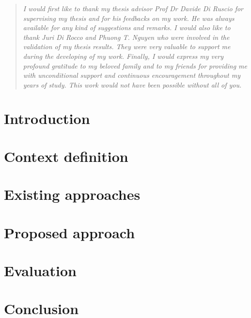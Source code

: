 \documentclass[11pt]{article} %
\date{} %
\begin{document}
 


\newpage 
\tableofcontents 
\newpage

\renewcommand{\abstractname}{Acknowledgements}
\begin{abstract}
\textit{
I would first like to thank my thesis advisor Prof Dr Davide Di Ruscio for supervising my thesis and for his feedbacks on my work. He was always available for any kind of suggestions and remarks.
I would also like to thank Juri Di Rocco and Phuong T. Nguyen who were involved in the validation of my thesis results. They were very valuable to support me during the developing of my work.
Finally, I would express my very profound gratitude to my beloved family and to my friends for providing me with unconditional support and continuous encouragement throughout my years of study. This work would not have been possible without all of you.}
\end{abstract}


\newpage

\section{Introduction}
		\label{sec:Introduction}
		



\section{Context definition}
\label{sec:Problemdefinition}



\section{Existing approaches}
\label{sec:RelatedWorks}





\section{Proposed approach}
\label{sec:MyApproach}



\section{Evaluation}
\label{sec:threats}



\section{Conclusion}
\label{sec:conclusion}

\newpage

{}

\end{document}

